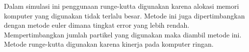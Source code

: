 Dalam simulasi ini penggunaan runge-kutta digunakan karena alokasi memori komputer yang digunakan tidak terlalu besar. Metode ini juga dipertimbangkan dengan metode euler dimana tingkat error yang lebih rendah. Mempertimbangkan jumlah partikel yang digunakan maka diambil metode ini. Metode runge-kutta digunakan karena kinerja pada komputer ringan.



%
%